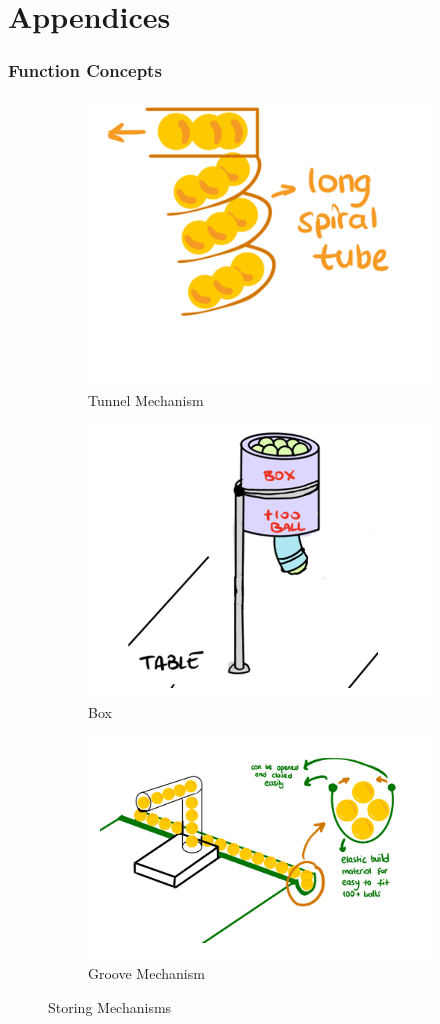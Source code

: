 \documentclass[12pt]{report}
\begin{document}


\chapter{Appendices}


\begin{appendices}

\subsection{Function Concepts}

\begin{figure}[H]
\centering
\begin{subfigure}{.3\textwidth}
  \centering
  \includegraphics[width=.3\linewidth]{Function photos/Tunnel.png}
  \caption{Tunnel Mechanism}
  \label{fig:tunnel_mechanism}
\end{subfigure}%
\begin{subfigure}{.3\textwidth}
  \centering
  \includegraphics[width=.3\linewidth]{Function photos/box.png}
  \caption{Box}
  \label{fig:box}
\end{subfigure}
\begin{subfigure}{.3\textwidth}
  \centering
  \includegraphics[width=.3\linewidth]{Function photos/groove.png}
  \caption{Groove Mechanism}
  \label{fig:groove_mechanism}
\end{subfigure}%
\caption{Storing Mechanisms}
\label{fig:storing_mechanism}
\end{figure}


\end{appendices}
\end{document}
